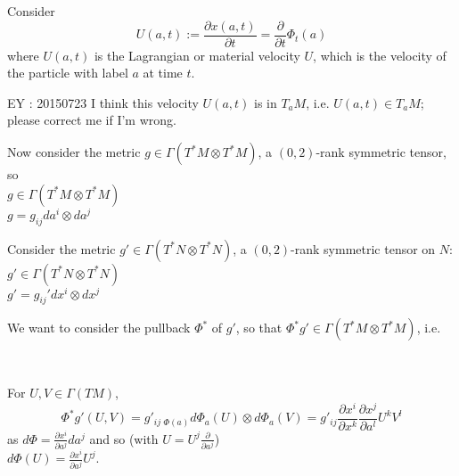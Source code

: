 \documentclass[twoside,landscape,10pt]{amsart}
\theoremstyle{plain}
\theoremstyle{definition}
\theoremstyle{remark}
\begin{document}
\begin{multicols*}{2}
Consider
\[
U(a,t) := \frac{ \partial x(a,t)}{ \partial t} = \frac{ \partial }{ \partial t} \Phi_t(a)
\]
where $U(a,t)$ is the Lagrangian or material velocity $U$, which is the velocity of the particle with label $a$ at time $t$.  

EY : 20150723 I think this velocity $U(a,t)$ is in $T_aM$, i.e. $U(a,t) \in T_aM$; please correct me if I'm wrong.

Now consider the metric $g \in \Gamma(T^*M \otimes T^*M)$, a $(0,2)$-rank symmetric tensor, so \\
$g \in \Gamma(T^*M \otimes T^*M) $ \\
$g= g_{ij}da^i \otimes da^j$ 

Consider the metric $g' \in \Gamma(T^*N \otimes T^*N)$, a $(0,2)$-rank symmetric tensor on $N$:\\
$g' \in \Gamma(T^*N \otimes T^*N)$ \\
$g' = g_{ij}'dx^i \otimes dx^j$

We want to consider the pullback $\Phi^*$ of $g'$, so that $\Phi^*g' \in \Gamma(T^*M \otimes T^*M)$, i.e.

  \quad \quad \,   

For $U,V \in \Gamma(TM)$, 
\[
\Phi^*g'(U,V) = g'_{ij\,\,\Phi(a)} d\Phi_a(U) \otimes d\Phi_a(V) = g'_{ij} \frac{ \partial x^i}{ \partial x^k} \frac{ \partial x^j}{ \partial a^l} U^k V^l
\]
as $d\Phi = \frac{ \partial x^i}{ \partial a^j} da^j$ and so (with $U = U^j \frac{ \partial }{ \partial a^j}$) \\
\phantom{as }$d\Phi(U) = \frac{ \partial x^i}{ \partial a^j} U^j$.  


\end{multicols*}
\end{document}
